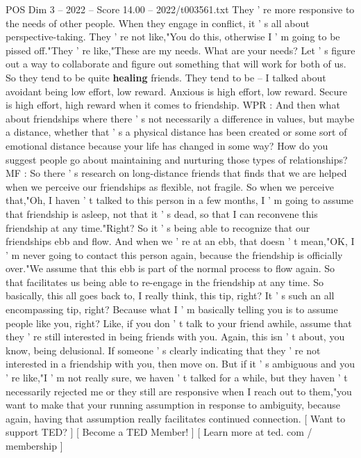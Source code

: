 \begin{textsample}{POS Dim 3 – 2022 – Score 14.00 – 2022/t003561.txt}
They ' re more responsive to the needs of other people.
When they engage in conflict, it ' s all about perspective-taking.
They ' re not like,"You do this, otherwise I ' m going to be pissed off."They ' re like,"These are my needs.
What are your needs?
Let ' s figure out a way to collaborate and figure out something that will work for both of us.
So they tend to be quite \textbf{healing} friends.
They tend to be -- I talked about avoidant being low effort, low reward.
Anxious is high effort, low reward.
Secure is high effort, high reward when it comes to friendship.
WPR : And then what about friendships where there ' s not necessarily a difference in values, but maybe a distance, whether that ' s a physical distance has been created or some sort of emotional distance because your life has changed in some way?
How do you suggest people go about maintaining and nurturing those types of relationships?
MF : So there ' s research on long-distance friends that finds that we are helped when we perceive our friendships as flexible, not fragile.
So when we perceive that,"Oh, I haven ' t talked to this person in a few months, I ' m going to assume that friendship is asleep, not that it ' s dead, so that I can reconvene this friendship at any time."Right?
So it ' s being able to recognize that our friendships ebb and flow.
And when we ' re at an ebb, that doesn ' t mean,"OK, I ' m never going to contact this person again, because the friendship is officially over."We assume that this ebb is part of the normal process to flow again.
So that facilitates us being able to re-engage in the friendship at any time.
So basically, this all goes back to, I really think, this tip, right?
It ' s such an all encompassing tip, right?
Because what I ' m basically telling you is to assume people like you, right?
Like, if you don ' t talk to your friend awhile, assume that they ' re still interested in being friends with you.
Again, this isn ' t about, you know, being delusional.
If someone ' s clearly indicating that they ' re not interested in a friendship with you, then move on.
But if it ' s ambiguous and you ' re like,"I ' m not really sure, we haven ' t talked for a while, but they haven ' t necessarily rejected me or they still are responsive when I reach out to them,"you want to make that your running assumption in response to ambiguity, because again, having that assumption really facilitates continued connection. [ Want to support TED? ] [ Become a TED Member! ] [ Learn more at ted. com / membership ]

\end{textsample}
